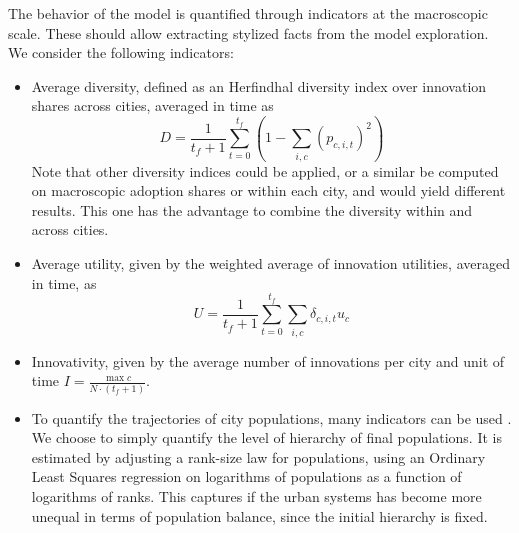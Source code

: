 \documentclass[letterpaper]{article}
\begin{document}
The behavior of the model is quantified through indicators at the macroscopic scale. These should allow extracting stylized facts from the model exploration. We consider the following indicators:
\begin{itemize}
	\item Average diversity, defined as an Herfindhal diversity index over innovation shares across cities, averaged in time as
	\begin{equation}
		D = \frac{1}{t_f + 1} \sum_{t=0}^{t_f} \left(1 - \sum_{i,c} \left(p_{c,i,t}\right)^2 \right)	
	\end{equation}
	Note that other diversity indices could be applied, or a similar be computed on macroscopic adoption shares or within each city, and would yield different results. This one has the advantage to combine the diversity within and across cities.
	\item Average utility, given by the weighted average of innovation utilities, averaged in time, as
	\begin{equation}
		U = \frac{1}{t_f + 1} \sum_{t=0}^{t_f} \sum_{i,c} \delta_{c,i,t} u_c 
	\end{equation}
	\item Innovativity, given by the average number of innovations per city and unit of time $I = \frac{\max c}{N\cdot (t_f + 1)}$.
	\item To quantify the trajectories of city populations, many indicators can be used \citep{raimbault2020unveiling}. We choose to simply quantify the level of hierarchy of final populations. It is estimated by adjusting a rank-size law for populations, using an Ordinary Least Squares regression on logarithms of populations as a function of logarithms of ranks. This captures if the urban systems has become more unequal in terms of population balance, since the initial hierarchy is fixed.
\end{itemize}
\end{document}
